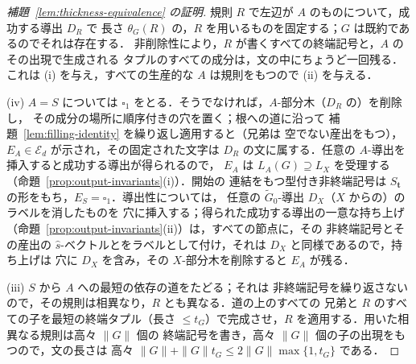 \documentclass[11pt,a4paper]{ltjsarticle}
\numberwithin{equation}{section}
\theoremstyle{plain}
\theoremstyle{definition}
\theoremstyle{remark}
\newcommand{\blank}{\square}
\theoremstyle{plain}
\begin{document}
\begin{proof}[補題~\ref{lem:thickness-equivalence} の証明]
規則 $R$ で左辺が $A$ のものについて，成功する導出 $D_R$ で
長さ $\theta_G(R)$ の，$R$ を用いるものを固定する；$G$ は既約であるのでそれは存在する．
非削除性により，$R$ が書くすべての終端記号と，$A$ のその出現で生成される
タプルのすべての成分は，文の中にちょうど一回残る．これは
(i) を与え，すべての生産的な $A$ は規則をもつので (ii) を与える．

(iv) $A=S$ については $\blank_1$ をとる．そうでなければ，$A$-部分木（$D_R$ の）を削除し，
その成分の場所に順序付きの穴を置く；根への道に沿って
補題~\ref{lem:filling-identity} を繰り返し適用すると（兄弟は
空でない産出をもつ），$E_A\in\mathcal E_d$ が示され，その固定された文字は
$D_R$ の文に属する．任意の $A$-導出を挿入すると成功する導出が得られるので，
$E_A$ は $L_A(G)\supseteq L_X$ を受理する
（命題~\ref{prop:output-invariants}(i)）．開始の
連結をもつ型付き非終端記号は $S_{\mathbf t}$ の形をもち，$E_S=\blank_1$．導出性については，
任意の $\widetilde G_0$-導出 $D_X$（$X$ からの）のラベルを消したものを
穴に挿入する；得られた成功する導出の一意な持ち上げ
（命題~\ref{prop:output-invariants}(ii)）は，すべての節点に，その
非終端記号とその産出の $\widehat s$-ベクトルとをラベルとして付け，それは $D_X$ と同様であるので，持ち上げは
穴に $D_X$ を含み，その $X$-部分木を削除すると $E_A$ が残る．

(iii) $S$ から $A$ への最短の依存の道をたどる；それは
非終端記号を繰り返さないので，その規則は相異なり，$R$ とも異なる．道の上のすべての
兄弟と $R$ のすべての子を最短の終端タプル（長さ
$\le t_G$）で完成させ，$R$ を適用する．用いた相異なる規則は高々 $\|G\|$ 個の
終端記号を書き，高々 $\|G\|$ 個の子の出現をもつので，文の長さは
高々 $\|G\|+\|G\|t_G\le2\|G\|\max\{1,t_G\}$ である．
\end{proof}
\end{document}
